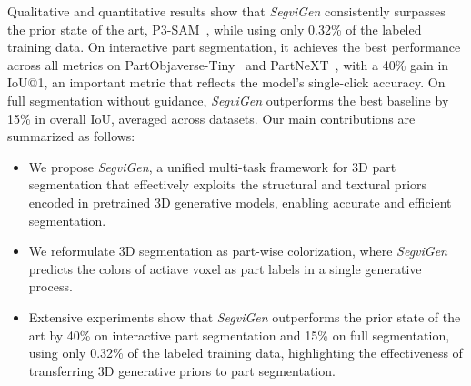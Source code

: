 Qualitative and quantitative results show that \textit{SegviGen} consistently surpasses the prior state of the art, P3-SAM~\cite{p3sam}, while using only 0.32\% of the labeled training data. %
%
On interactive part segmentation, it achieves the best performance across all metrics on PartObjaverse-Tiny~\cite{partobjaverse_tiny} and PartNeXT~\cite{partnext}, with a 40\% gain in IoU@1, an important metric that reflects the model’s single-click accuracy. 
%
On full segmentation without guidance, \textit{SegviGen} outperforms the best baseline by 15\% in overall IoU, averaged across datasets.
%
Our main contributions are summarized as follows:
\begin{itemize}[leftmargin=*, topsep=2pt, itemsep=1pt, parsep=0pt, partopsep=0pt]
    \item We propose \textit{SegviGen}, a unified multi-task framework for 3D part segmentation that effectively exploits the structural and textural priors encoded in pretrained 3D generative models, enabling accurate and efficient segmentation.
    \item We reformulate 3D segmentation as part-wise colorization, where \textit{SegviGen} predicts the colors of actiave voxel as part labels in a single generative process.
    \item Extensive experiments show that \textit{SegviGen} outperforms the prior state of the art by 40\% on interactive part segmentation and 15\% on full segmentation, using only 0.32\% of the labeled training data, highlighting the effectiveness of transferring 3D generative priors to part segmentation.
\end{itemize}

